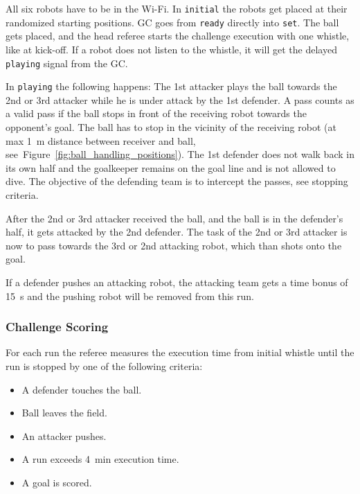         All six robots have to be in the Wi-Fi. In \texttt{initial} the robots get placed at their randomized starting positions. GC goes from \texttt{ready} directly into \texttt{set}. The ball gets placed, and the head referee starts the challenge execution with one whistle, like at kick-off. If a robot does not listen to the whistle, it will get the delayed \texttt{playing} signal from the GC.

        In \texttt{playing} the following happens: The 1st attacker plays the ball towards the 2nd or 3rd attacker while he is under attack by the 1st defender.
        A pass counts as a valid pass if the ball stops in front of the receiving robot towards the opponent's goal. The ball has to stop in the vicinity of the receiving robot (at max \qty{1}{\metre} distance between receiver and ball, see~Figure~\ref{fig:ball_handling_positions}).
        The 1st defender does not walk back in its own half and the goalkeeper remains on the goal line and is not allowed to dive. The objective of the defending team is to intercept the passes, see stopping criteria.

        After the 2nd or 3rd attacker received the ball, and the ball is in the defender's half, it gets attacked by the 2nd defender. The task of the 2nd or 3rd attacker is now to pass towards the 3rd or 2nd attacking robot, which than shots onto the goal.

        If a defender pushes an attacking robot, the attacking team gets a time bonus of \qty{15}{\second} and the pushing robot will be removed from this run.

    \subsubsection{Challenge Scoring}

        For each run the referee measures the execution time from initial whistle until the run is stopped by one of the following criteria:

        \begin{itemize}
            \item A defender touches the ball.
            \item Ball leaves the field.
            \item An attacker pushes.
            \item A run exceeds \qty{4}{\minute} execution time.
            \item A goal is scored.
        \end{itemize}

